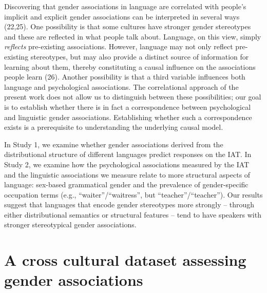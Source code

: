 \documentclass[9pt,twocolumn]{pnas-new}
\begin{document}
Discovering that gender associations in language are correlated with people’s implicit and explicit gender associations can be interpreted in several ways  (22,25).  One possibility is that some cultures have stronger gender stereotypes and these are reflected in what people talk about. Language, on this view, simply \emph{reflects} pre-existing associations. However, language may not only reflect pre-existing stereotypes, but may also provide a distinct source of information for
learning about them, thereby constituting a causal influence on the associations people learn (26). Another possibility is that a third variable influences both language and psychological associations. The correlational approach of the present work does not allow us to distinguish between these possibilities; our  goal is to establish whether there is in fact a correspondence between psychological and linguistic gender associations. Establishing whether such a correspondence exists is a prerequisite to understanding the underlying causal model.

In Study 1, we examine whether gender associations derived from the distributional structure of different languages predict responses on the IAT. In Study 2, we examine how the psychological
associations measured by the IAT and the linguistic associations we measure relate
to more structural aspects of language: sex-based grammatical gender and
the prevalence of gender-specific occupation terms (e.g.,
\enquote{waiter}/\enquote{waitress}, but
\enquote{teacher}/\enquote{teacher}). Our results suggest that languages that encode gender stereotypes more strongly -- through either distributional semantics or structural features -- tend to have speakers with stronger stereotypical gender associations. 

\section*{A cross cultural dataset assessing gender associations}\label{description-of-cross-cultural-dataset-of-psychological-gender-bias}
\end{document}
